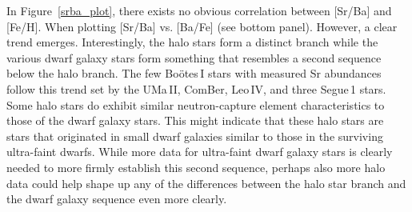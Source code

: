\documentclass[]{emulateapj}
\begin{document}
In Figure~\ref{srba_plot}, there exists no obvious correlation between
[Sr/Ba] and [Fe/H]. When plotting [Sr/Ba] vs. [Ba/Fe] (see bottom
panel). However, a clear trend emerges. Interestingly, the halo stars
form a distinct branch while the various dwarf galaxy stars form
something that resembles a second sequence below the halo branch. The
few Bo\"otes\,I stars with measured Sr abundances follow this trend
set by the UMa\,II, ComBer, Leo\,IV, and three Segue\,1 stars. Some
halo stars do exhibit similar neutron-capture element characteristics
to those of the dwarf galaxy stars. This might indicate that these
halo stars are stars that originated in small dwarf galaxies similar
to those in the surviving ultra-faint dwarfs. While more data for
ultra-faint dwarf galaxy stars is clearly needed to more firmly
establish this second sequence, perhaps also more halo data could help
shape up any of the differences between the halo star branch and the
dwarf galaxy sequence even more clearly.
\end{document}
